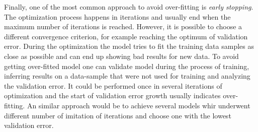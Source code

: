 Finally, one of the most common approach to avoid over-fitting is \emph{early stopping}.
The optimization process happens in iterations and usually end when the maximum number of iterations is reached.
However, it is possible to choose a different convergence criterion, for example reaching the optimum of validation error.
During the optimization the model tries to fit the training data samples as close as possible and can end up showing bad results for new data.
To avoid getting over-fitted model one can validate model during the process of training, inferring results on a data-sample that were not used for training and analyzing the validation error.
It could be performed once in several iterations of optimization and the start of validation error growth usually indicates over-fitting.
An similar approach would be to achieve several models  whir underwent different number of imitation of iterations and choose one with the lowest validation error.